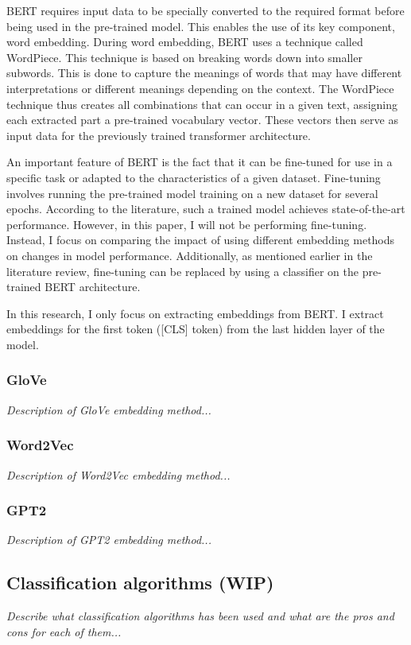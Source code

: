 BERT requires input data to be specially converted to the required format before being used in the pre-trained model. This enables the use of its key component, word embedding. During word embedding, BERT uses a technique called WordPiece. This technique is based on breaking words down into smaller subwords. This is done to capture the meanings of words that may have different interpretations or different meanings depending on the context. The WordPiece technique thus creates all combinations that can occur in a given text, assigning each extracted part a pre-trained vocabulary vector. These vectors then serve as input data for the previously trained transformer architecture.

An important feature of BERT is the fact that it can be fine-tuned for use in a specific task or adapted to the characteristics of a given dataset. Fine-tuning involves running the pre-trained model training on a new dataset for several epochs. According to the literature, such a trained model achieves state-of-the-art performance. However, in this paper, I will not be performing fine-tuning. Instead, I focus on comparing the impact of using different embedding methods on changes in model performance. Additionally, as mentioned earlier in the literature review, fine-tuning can be replaced by using a classifier on the pre-trained BERT architecture.

In this research, I only focus on extracting embeddings from BERT. I extract embeddings for the first token ([CLS] token) from the last hidden layer of the model.

\subsubsection{GloVe}
\textit{Description of GloVe embedding method...}

\subsubsection{Word2Vec}
\textit{Description of Word2Vec embedding method...}

\subsubsection{GPT2}
\textit{Description of GPT2 embedding method...}


\subsection{Classification algorithms (WIP)}
\textit{Describe what classification algorithms has been used and what are the pros and cons for each of them...}

